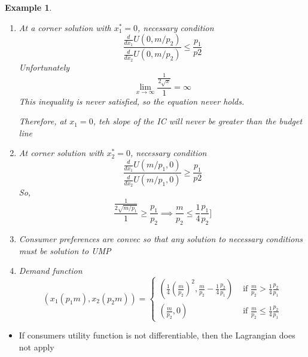 \documentclass[twoside]{article}
\newtheorem{ex}[theorem]{Example}
\begin{document}
\begin{ex}
\begin{enumerate}
Divide \((L1)\) by \((L2)\)
\[\begin{aligned}
\frac{1}{2 \sqrt{x_1}} = \frac{p_1}{p_2}\\
x_1^* = \frac{1}{4} ( \frac{p_2}{p_1})^2    \hspace{0.2cm} (\star) 
\end{aligned}\]
Substitute \((\star)\) into \(L(\lambda)\) : 
\[x_2^* = \frac{m}{p_2} - \frac{1}{4} \frac{p_2}{p_1}\]
There is a condition though. \((L1) - (L\lambda)\) only has a solution if \(\frac{m}{p_2} > \frac{1}{4} \frac{p_2}{p_1}\)
\item At a corner solution with \(x_1^* = 0 \), necessary condition 
\[\frac{\frac{d}{dx_1} U(0, m/p_2)}{\frac{d}{dx_2} U(0, m/p_2)} \leq \frac{p_1}{p2}\]
Unfortunately 
\[\lim_{x\rightarrow \infty} \frac{\frac{1}{2\sqrt{x}}}{1}  = \infty\]
This inequality is never satisfied, so the equation never holds.

Therefore, at \(x_1 = 0\), teh slope of the IC will never be greater than the budget line

\item At corner solution with \(x_2^* = 0\), necessary condition 
\[\frac{\frac{d}{dx_1} U(m/p_1, 0)}{\frac{d}{dx_2} U(m/p_1, 0)} \geq \frac{p_1}{p2}\]
So, 
\[\frac{\frac{1}{2\sqrt{m / p_1 }}}{1} \geq \frac{p_1}{p_2} \implies \frac{m}{p_2} \leq \frac{1}{4} \frac{p_1}{p_2}]\]
\item Consumer preferences are convec so that any solution to necessary conditions  must be solution to UMP
\item Demand function 
\[(x_1(p_1 m), x_2 (p_2m)) = \begin{cases} 
\left( \frac{1}{4} (\frac{m}{p_2})^2 , \frac{m}{p_2} - \frac{1}{4} \frac{p_2}{p_1}\right) & \text { if  } 
\frac{m}{p_2} > \frac{1}{4} \frac{p_2}{p_1}\\
\left(  \frac{m}{p_2}, 0 \right) & \text { if    } \frac{m}{p_2} \leq \frac{1}{4} \frac{p_2}{p_1}\end{cases}\]
\end{enumerate}
\end{ex}

\begin{itemize}
\item If consumers utility function is not differentiable, then the Lagrangian does not apply 
\end{itemize}
\end{document}
